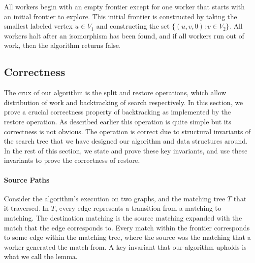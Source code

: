 All workers begin with an empty frontier
except for one worker that starts with an initial
frontier to explore.
%
This initial frontier is constructed by taking
the smallest labeled vertex $u \in V_1$ and
constructing the set $\{(u, v, 0) : v \in V_2\}$.
%
All workers halt after an isomorphism has been
found, and if all workers run out of work, then the
algorithm returns false.
%

\subsection{Correctness}

The crux of our algorithm is the split and restore operations, which
allow distribution of work and backtracking of search respectively.
%
In this section, we prove a crucial correctness property of
backtracking as implemented by the restore operation.
%
As described earlier this operation is quite simple but its
correctness is not obvious.
%
The operation is correct due to structural invariants of the search
tree that we have designed our algorithm and data structures around.
%
In the rest of this section, we state and prove these key invariants,
and use these invariants to prove the correctness of restore.


%

\paragraph{Source Paths}
Consider the algorithm's execution on two graphs,
and the matching tree $T$ that it traversed.
%
In $T$, every edge represents a transition
from a  matching to  matching.
%
The destination matching is the source matching expanded
with the match that the edge corresponds to.
%
Every match within the frontier corresponds to some
edge within the matching tree, where the source was the
matching that a worker generated the match from.
%
A key invariant that our algorithm upholds is what
we call the  lemma.

